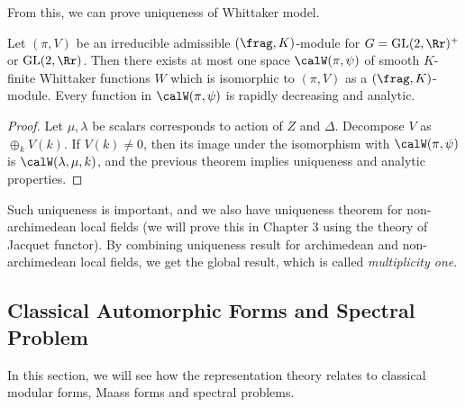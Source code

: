 From this, we can prove uniqueness of Whittaker model.
\begin{theorem}
\label{archwit}
Let $(\pi, V)$ be an irreducible admissible $(\frag, K)$-module for $G = \GL(2, \Rr)^{+}$ or $\GL(2, \Rr)$. Then there exists at most one space $\calW(\pi, \psi)$ of smooth $K$-finite Whittaker functions $W$ which is isomorphic to $(\pi, V)$ as a $(\frag, K)$-module. Every function in $\calW(\pi, \psi)$ is rapidly decreasing and analytic. 
\end{theorem}
\begin{proof}
Let $\mu, \lambda$ be scalars corresponds to action of $Z$ and $\Delta$. Decompose $V$ as $\oplus_{k} V(k)$. If $V(k)\neq 0$, then its image under the isomorphism with $\calW(\pi, \psi)$ is $\calW(\lambda, \mu, k)$, and the previous theorem implies uniqueness and analytic properties. 
\end{proof}
Such uniqueness is important, and we also have uniqueness theorem for non-archimedean local fields (we will prove this in Chapter 3 using the theory of Jacquet functor). By combining uniqueness result for archimedean and non-archimedean local fields, we get the global result, which is called \emph{multiplicity one}. 

\subsection{Classical Automorphic Forms and Spectral Problem}
In this section, we will see how the representation theory relates to classical modular forms, Maass forms and spectral problems. 

